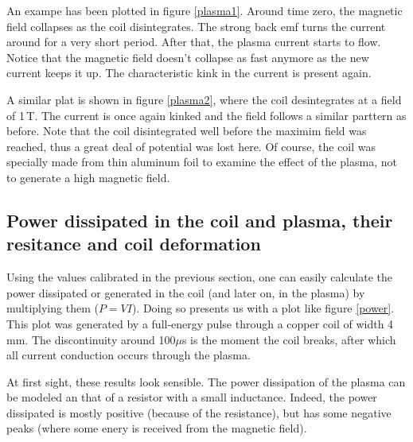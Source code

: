 An exampe has been plotted in figure \ref{plasma1}. Around time zero, the 
magnetic field collapses as the coil disintegrates. The strong back emf 
turns the current around for a very short period. After that, the plasma 
current starts to flow.  Notice that the magnetic field doesn't collapse as 
fast anymore as the new current keeps it up. The characteristic kink in the 
current is present again.



A similar plat is shown in figure \ref{plasma2}, where the coil 
desintegrates at a field of 1\,T. The current is once again kinked and the 
field follows a similar parttern as before. Note that the coil 
disintegrated well before the maximim field was reached, thus a great deal 
of potential was lost here. Of course, the coil was specially made from 
thin aluminum foil to examine the effect of the plasma, not to generate a 
high magnetic field.



\subsection{Power dissipated in the coil and plasma, their resitance and 
coil deformation}

Using the values calibrated in the previous section, one can easily 
calculate the power dissipated or generated in the coil (and later on, in 
the plasma) by multiplying them ($P = VI$).  Doing so presents us with a 
plot like figure \ref{power}. This plot was generated by a full-energy 
pulse through a copper coil of width 4\,mm. The discontinuity around 
100$\mu$s is the moment the coil breaks, after which all current conduction 
occurs through the plasma.

At first sight, these results look sensible. The power dissipation of the 
plasma can be modeled an that of a resistor with a small inductance.  
Indeed, the power dissipated is mostly positive (because of the 
resistance), but has some negative peaks (where some enery is received from 
the magnetic field).

